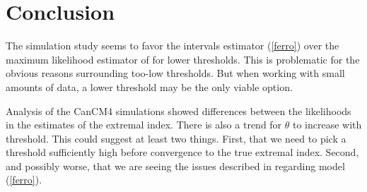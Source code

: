 \section{Conclusion}
\label{conclusion}

The simulation study seems to favor the intervals estimator (\ref{ferro}) over the maximum likelihood estimator of \cite{suveges2010model} for lower thresholds. This is problematic for the obvious reasons surrounding too-low thresholds. But when working with small amounts of data, a lower threshold may be the only viable option.

Analysis of the CanCM4 simulations showed differences between the likelihoods in the estimates of the extremal index. There is also a trend for $\theta$ to increase with threshold. This could suggest at least two things. First, that we need to pick a threshold sufficiently high before convergence to the true extremal index. Second, and possibly worse, that we are seeing the issues described in \cite{ferro2003inference} regarding model (\ref{ferro}).
